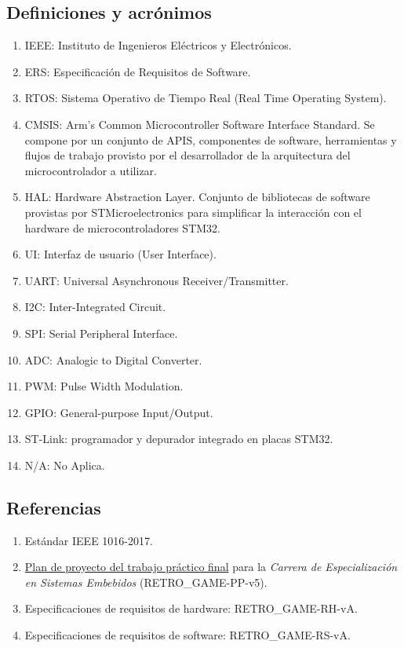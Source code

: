 \documentclass[11pt,a4paper]{article}
\begin{document}
\subsection{Definiciones y acrónimos}
  \begin{enumerate}
    \item IEEE: Instituto de Ingenieros Eléctricos y Electrónicos.
    \item ERS: Especificación de Requisitos de Software.
    \item RTOS: Sistema Operativo de Tiempo Real (Real Time Operating System).
    \item CMSIS: Arm's Common Microcontroller Software Interface Standard. Se compone por un conjunto de APIS, componentes de software, herramientas y flujos de trabajo provisto por el desarrollador de la arquitectura del microcontrolador a utilizar.
    \item HAL: Hardware Abstraction Layer. Conjunto de bibliotecas de software provistas por STMicroelectronics para simplificar la interacción con el hardware de microcontroladores STM32.
    \item UI: Interfaz de usuario (User Interface).
    \item UART: Universal Asynchronous Receiver/Transmitter. 
    \item I2C: Inter-Integrated Circuit.
    \item SPI: Serial Peripheral Interface.
    \item ADC: Analogic to Digital Converter.
    \item PWM: Pulse Width Modulation.
    \item GPIO: General-purpose Input/Output.
    \item ST-Link: programador y depurador integrado en placas STM32.
    \item N/A: No Aplica.
  \end{enumerate}

\subsection{Referencias}

\begin{enumerate}
  \item Estándar IEEE 1016-2017.
  \item \href{https://drive.google.com/file/d/1C3vEYR8wME6EzlZVVC-gT2u86dwnoZA-/view?usp=sharing}{Plan de proyecto del trabajo práctico final} para la \textit{Carrera de Especialización en Sistemas Embebidos} (RETRO\_GAME-PP-v5). 
  \item Especificaciones de requisitos de hardware: RETRO\_GAME-RH-vA.
  \item Especificaciones de requisitos de software: RETRO\_GAME-RS-vA.
\end{enumerate}
\end{document}

